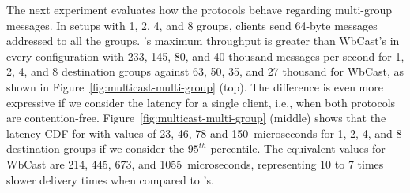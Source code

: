 The next experiment evaluates how the protocols behave regarding multi-group messages. 
In setups with 1, 2, 4, and 8 groups, clients send 64-byte messages addressed to all the groups.
\libname's maximum throughput is greater than WbCast's in every configuration with 233, 145, 80, and 40 thousand messages per second for 1, 2, 4, and 8 destination groups against 63, 50, 35, and 27 thousand for WbCast, as shown in Figure~\ref{fig:multicast-multi-group} (top).
The difference is even more expressive if we consider the latency for a single client, i.e., when both protocols are contention-free. Figure~\ref{fig:multicast-multi-group} (middle) shows that the latency CDF for \libname with values of 23, 46, 78 and 150~microseconds for 1, 2, 4, and 8 destination groups if we consider the $95^{th}$ percentile. 
The equivalent values for WbCast are 214, 445, 673, and 1055~microseconds, representing 10 to 7 times slower delivery times when compared to \libname's.

